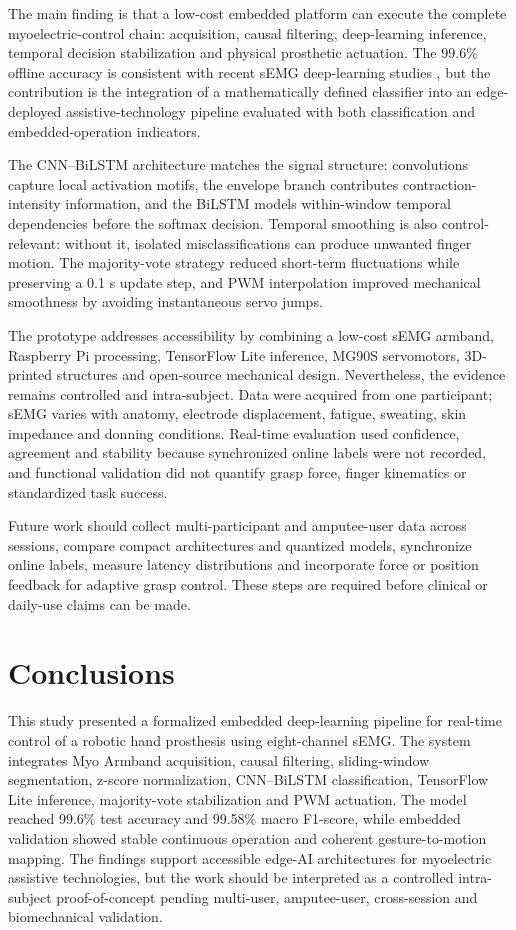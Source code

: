 \documentclass[technologies,article,submit,pdftex,moreauthors]{Definitions/mdpi}
\begin{document}
The main finding is that a low-cost embedded platform can execute the complete myoelectric-control chain: acquisition, causal filtering, deep-learning inference, temporal decision stabilization and physical prosthetic actuation. The 99.6\% offline accuracy is consistent with recent sEMG deep-learning studies \cite{Nahid2020Myo,Chung2019Myo,Celik2026,Tsinganos2018,Shanmuganathan2023}, but the contribution is the integration of a mathematically defined classifier into an edge-deployed assistive-technology pipeline evaluated with both classification and embedded-operation indicators.

The CNN--BiLSTM architecture matches the signal structure: convolutions capture local activation motifs, the envelope branch contributes contraction-intensity information, and the BiLSTM models within-window temporal dependencies before the softmax decision. Temporal smoothing is also control-relevant: without it, isolated misclassifications can produce unwanted finger motion. The majority-vote strategy reduced short-term fluctuations while preserving a 0.1 s update step, and PWM interpolation improved mechanical smoothness by avoiding instantaneous servo jumps.

The prototype addresses accessibility by combining a low-cost sEMG armband, Raspberry Pi processing, TensorFlow Lite inference, MG90S servomotors, 3D-printed structures and open-source mechanical design. Nevertheless, the evidence remains controlled and intra-subject. Data were acquired from one participant; sEMG varies with anatomy, electrode displacement, fatigue, sweating, skin impedance and donning conditions. Real-time evaluation used confidence, agreement and stability because synchronized online labels were not recorded, and functional validation did not quantify grasp force, finger kinematics or standardized task success.

Future work should collect multi-participant and amputee-user data across sessions, compare compact architectures and quantized models, synchronize online labels, measure latency distributions and incorporate force or position feedback for adaptive grasp control. These steps are required before clinical or daily-use claims can be made.

\section{Conclusions}

This study presented a formalized embedded deep-learning pipeline for real-time control of a robotic hand prosthesis using eight-channel sEMG. The system integrates Myo Armband acquisition, causal filtering, sliding-window segmentation, z-score normalization, CNN--BiLSTM classification, TensorFlow Lite inference, majority-vote stabilization and PWM actuation. The model reached 99.6\% test accuracy and 99.58\% macro F1-score, while embedded validation showed stable continuous operation and coherent gesture-to-motion mapping. The findings support accessible edge-AI architectures for myoelectric assistive technologies, but the work should be interpreted as a controlled intra-subject proof-of-concept pending multi-user, amputee-user, cross-session and biomechanical validation.
\end{document}
